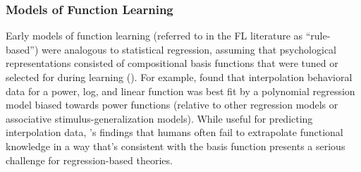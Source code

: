 \documentclass[12pt]{article}
\let\oldcite=\cite
\let\oldtextcite=\textcite
\renewcommand{\cite}[1]{\textcolor[rgb]{0, .121, .388}{\oldcite{#1}}}
\renewcommand{\textcite}[1]{\textcolor[rgb]{0, .121, .388}{\oldtextcite{#1}}}
\begin{document}
\subsubsection{Models of Function Learning}
Early models of function learning (referred to in the FL literature as ``rule-based'') were analogous to statistical regression, assuming that psychological representations consisted of compositional basis functions that were tuned or selected for during learning (\cite{brehmer1974hypotheses,koh1991function}). For example, \textcite{brehmer1974hypotheses} found that interpolation behavioral data for a power, log, and linear function was best fit by a polynomial regression model biased towards power functions (relative to other regression models or associative stimulus-generalization models). While useful for predicting interpolation data, \textcite{delosh1997extrapolation}'s findings that humans often fail to extrapolate functional knowledge in a way that's consistent with the basis function presents a serious challenge for regression-based theories. 
\end{document}
